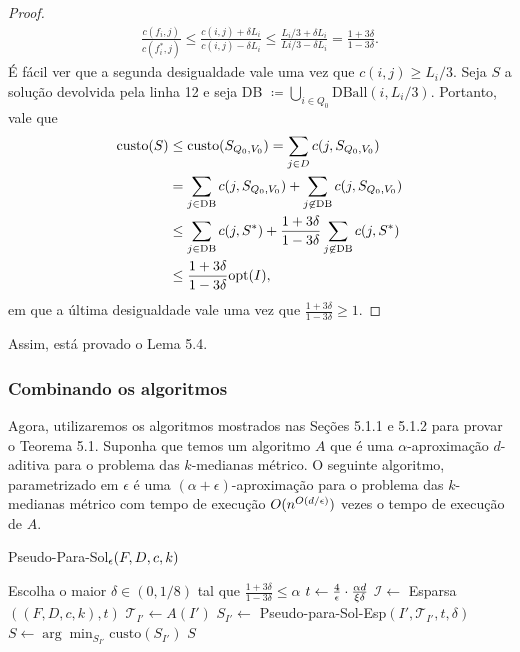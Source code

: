 \begin{proof}
        \begin{subequations}
            \begin{align*}
                \frac{c(f_i,j)}{c(f_i^*,j)} \leq \frac{c(i,j) + \delta L_i}{c(i,j) - \delta L_i} \leq \frac{L_i/3 + \delta L_i}{Li/3 - \delta L_i} = \frac{1 +3\delta}{1 - 3\delta}.
            \end{align*}
        \end{subequations}
        É fácil ver que a segunda desigualdade vale uma vez que $c(i,j) \geq L_i/3$. Seja $S$ a solução devolvida pela linha 12 e seja DB $\coloneqq\bigcup_{i \in Q_0} \text{DBall}(i,L_i/3)$. Portanto, vale que
        \begin{subequations}
            \begin{align*}
                \text{custo}(S) &\leq \text{custo}(S_{Q_0,V_0}) = \sum_{j \in D} c(j,S_{Q_0,V_0}) \\
                &= \sum_{j \in \text{DB}} c(j,S_{Q_0,V_0}) + \sum_{j \not \in \text{DB}} c(j,S_{Q_0,V_0}) \\
                &\leq \sum_{j \in \text{DB}} c(j, S^*) + \frac{1 +3\delta}{1 - 3\delta} \sum_{j \not \in \text{DB}}  c(j,S^*)\\
                &\leq  \frac{1 +3\delta}{1 - 3\delta} \mathrm{opt}(I),
            \end{align*}
        \end{subequations}
            em que a última desigualdade vale uma vez que $\frac{1 +3\delta}{1 - 3\delta} \geq 1$.
\end{proof}

Assim, está provado o Lema 5.4.

\subsubsection{Combinando os algoritmos}

Agora, utilizaremos os algoritmos mostrados nas Seções 5.1.1 e 5.1.2 para provar o Teorema 5.1. Suponha que temos um algoritmo $A$ que é uma $\alpha$-aproximação $d$-aditiva para o problema das $k$-medianas métrico. O seguinte algoritmo, parametrizado em $\epsilon$ é uma $(\alpha + \epsilon)$-aproximação para o problema das $k$-medianas métrico com tempo de execução $O(n^{O(d/\epsilon)})$ vezes o tempo de execução de $A$.

\begin{algorithm}
    \caption{\sc Pseudo-Para-Sol$_\epsilon(F,D,c,k)$}
    \begin{algorithmic}[1]
        \State Escolha o maior $\delta \in (0,1/8)$ tal que $\frac{1+3\delta}{1-3\delta} \leq \alpha$
        \State $ t \gets \frac{4}{\epsilon} \cdot \frac{\alpha d}{\xi \delta}$
        \State $\mathcal{I} \gets$ {\sc Esparsa}$((F,D,c,k),t)$
        \State $\mathcal{T}_{I'} \gets A(I')$
        \State $S_{I'} \gets $ {\sc Pseudo-para-Sol-Esp}$(I', \mathcal{T}_{I'},t,\delta)$
        \EndFor
        \State $S \gets \arg\min_{S_{I'}} \text{custo}(S_{I'})$
        \State \Return $S$
    \end{algorithmic}
\end{algorithm}

